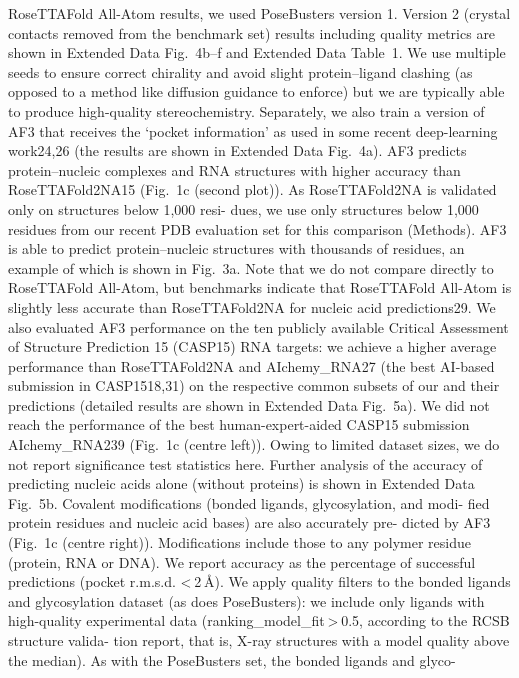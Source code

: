 RoseTTAFold All-Atom results, we used PoseBusters version 1. Version
2 (crystal contacts removed from the benchmark set) results including
quality metrics are shown in Extended Data Fig. 4b–f and Extended Data
Table 1. We use multiple seeds to ensure correct chirality and avoid
slight protein–ligand clashing (as opposed to a method like diffusion
guidance to enforce) but we are typically able to produce high-quality
stereochemistry. Separately, we also train a version of AF3 that receives
the ‘pocket information’ as used in some recent deep-learning work24,26
(the results are shown in Extended Data Fig. 4a).
AF3 predicts protein–nucleic complexes and RNA structures with
higher accuracy than RoseTTAFold2NA15 (Fig. 1c (second plot)). As
RoseTTAFold2NA is validated only on structures below 1,000 resi-
dues, we use only structures below 1,000 residues from our recent PDB
evaluation set for this comparison (Methods). AF3 is able to predict
protein–nucleic structures with thousands of residues, an example
of which is shown in Fig. 3a. Note that we do not compare directly to
RoseTTAFold All-Atom, but benchmarks indicate that RoseTTAFold
All-Atom is slightly less accurate than RoseTTAFold2NA for nucleic
acid predictions29.
We also evaluated AF3 performance on the ten publicly available
Critical Assessment of Structure Prediction 15 (CASP15) RNA targets:
we achieve a higher average performance than RoseTTAFold2NA and
AIchemy\_RNA27 (the best AI-based submission in CASP1518,31) on the
respective common subsets of our and their predictions (detailed
results are shown in Extended Data Fig. 5a). We did not reach the
performance of the best human-expert-aided CASP15 submission
AIchemy\_RNA239 (Fig. 1c (centre left)). Owing to limited dataset sizes,
we do not report significance test statistics here. Further analysis of
the accuracy of predicting nucleic acids alone (without proteins) is
shown in Extended Data Fig. 5b.
Covalent modifications (bonded ligands, glycosylation, and modi-
fied protein residues and nucleic acid bases) are also accurately pre-
dicted by AF3 (Fig. 1c (centre right)). Modifications include those to
any polymer residue (protein, RNA or DNA). We report accuracy as the
percentage of successful predictions (pocket r.m.s.d. < 2 Å). We apply
quality filters to the bonded ligands and glycosylation dataset (as does
PoseBusters): we include only ligands with high-quality experimental
data (ranking\_model\_fit > 0.5, according to the RCSB structure valida-
tion report, that is, X-ray structures with a model quality above the
median). As with the PoseBusters set, the bonded ligands and glyco-
